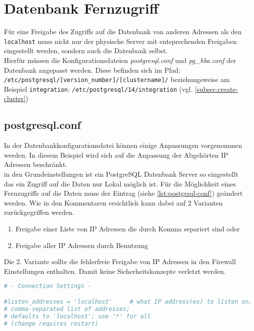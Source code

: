 \section{Datenbank Fernzugriff}
Für eine Freigabe des Zugriffs auf die Datenbank von anderen Adressen als den \lstinline|localhost| muss nicht nur der physische Server mit entsprechenden Freigaben eingestellt werden, sondern auch die Datenbank selbst.\\
Hierfür müssen die Konfigurationsdateien \textit{postgresql.conf} und \textit{pg\_hba.conf} der Datenbank angepasst werden. Diese befinden sich im Pfad: \lstinline|/etc/postgresql/[version_number]/[clustername]/| beziehungsweise am Beispiel \lstinline|integration|: \lstinline|/etc/postgresql/14/integration| (vgl. \autoref{subsec:create-cluster})

\subsection{postgresql.conf}
In der Datenbankkonfigurationsdatei können einige Anpassungen vorgenommen werden. In diesem Beispiel wird sich auf die Anpassung der Abgehörten IP Adressen beschränkt.\\
in den Grundeinstellungen ist ein PostgreSQL Datenbank Server so eingestellt das ein Zugriff auf die Daten nur Lokal möglich ist. Für die Möglichkeit eines Fernzugriffs auf die Daten muss der Eintrag (siehe \autoref{lst:postgrsql-conf}) geändert werden. Wie in den Kommentaren ersichtlich kann dabei auf 2 Varianten zurückgegriffen werden.
\begin{enumerate}
	\item Freigabe einer Liste von IP Adressen die durch Komma separiert sind oder
	\item Freigabe aller IP Adressen durch Benutzung \gequote{*}
\end{enumerate}
Die 2. Variante sollte die fehlerfreie Freigabe von IP Adressen in den Firewall Einstellungen enthalten. Damit keine Sicherheitskonzepte verletzt werden.

\begin{lstlisting}[language=bash,caption={postgresql.conf Ausschnitt},label={lst:postgrsql-conf},commentstyle=\color{black}]
# - Connection Settings -

#listen_addresses = 'localhost'		# what IP address(es) to listen on;
# comma-separated list of addresses;
# defaults to 'localhost'; use '*' for all
# (change requires restart)
\end{lstlisting}

